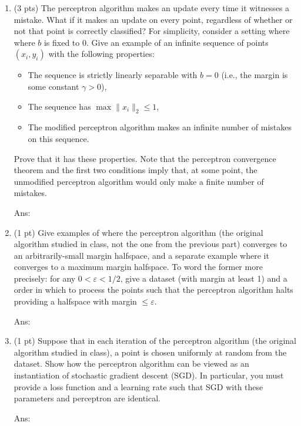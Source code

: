 \documentclass[10pt,letter,notitlepage]{article}
\newcommand{\ans}[1]{{\color{orange}\textsf{Ans}: #1}}
\newcounter{exercise}
\begin{document}
\begin{exercise}
  \begin{enumerate}
    \item (3 pts) The perceptron algorithm makes an update every time it witnesses a mistake.
      What if it makes an update on every point, regardless of whether or not that point is correctly classified? 
      For simplicity, consider a setting where where $b$ is fixed to $0$.
      Give an example of an infinite sequence of points $(x_i, y_i)$ with the following properties:
    \begin{itemize}
      \item The sequence is strictly linearly separable with $b = 0$ (i.e., the margin is some constant $\gamma > 0$),
      \item The sequence has $\max \|x_i\|_2 \leq 1$,
      \item The modified perceptron algorithm makes an infinite number of mistakes on this sequence. 
    \end{itemize}
    Prove that it has these properties.
      Note that the perceptron convergence theorem and the first two conditions imply that, at some point, the unmodified perceptron algorithm would only make a finite number of mistakes.

\ans{}

  \item (1 pt) Give examples of where the perceptron algorithm (the original algorithm studied in class, not the one from the previous part) converges to an arbitrarily-small margin halfspace, and a separate example where it converges to a maximum margin halfspace. 
    To word the former more precisely: for any $0 < \varepsilon < 1/2$, give a dataset (with margin at least 1) and a order in which to process the points such that the perceptron algorithm halts providing a halfspace with margin $\leq \varepsilon$.

\ans{} 
  \item (1 pt) Suppose that in each iteration of the perceptron algorithm (the original algorithm studied in class), a point is chosen uniformly at random from the dataset.
    Show how the perceptron algorithm can be viewed as an instantiation of stochastic gradient descent (SGD). 
      In particular, you must provide a loss function and a learning rate such that SGD with these parameters and perceptron are identical. 

      \ans{} 
  \end{enumerate}
\end{exercise}
\end{document}
